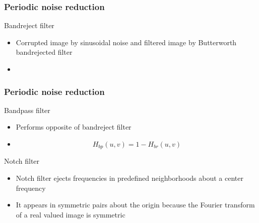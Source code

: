 \documentclass{beamer}
\begin{document}
\begin{frame}
\frametitle{Periodic noise reduction}
\begin{block}{Bandreject filter}
\begin{itemize}
\item[]Corrupted image by sinusoidal noise and filtered image by Butterworth bandrejected filter
\item[]
\end{itemize}
\end{block}
\end{frame}
\begin{frame}
\frametitle{Periodic noise reduction}
\begin{block}{Bandpass filter}
\begin{itemize}
\item[]Performs opposite of bandreject filter 
\item[]$$ H_{bp}(u,v) = 1 - H_{br}(u,v)$$
\end{itemize}
\end{block}
\begin{block}{Notch filter}
\begin{itemize}
\item Notch filter ejects frequencies in predefined neighborhoods about a center frequency
\item It appears in symmetric pairs about the origin because the Fourier transform of a real valued image is symmetric
\end{itemize}
\end{block}
\end{frame}
\end{document}
